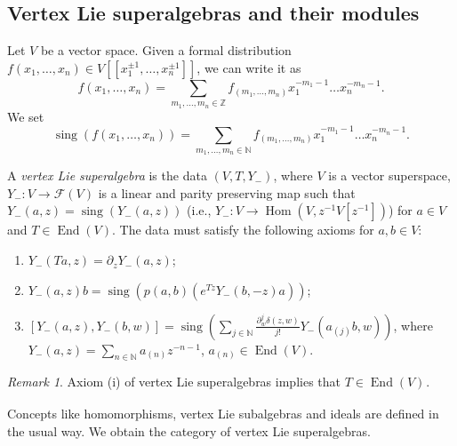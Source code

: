 \documentclass[a4paper, 12pt, reqno]{amsart}
\theoremstyle{remark}
\newtheorem{remark}[theorem]{Remark}
\DeclareMathOperator{\End}{End}
\DeclareMathOperator{\zero}{\overline{0}}
\DeclareMathOperator{\Hom}{Hom}
\DeclareMathOperator{\sing}{sing}
\begin{document}
\subsection{Vertex Lie superalgebras and their modules}
\label{sec:vert-lie-supera}

Let $V$ be a vector space.
Given a formal distribution $f(x_1, \dots, x_n) \in V[[x_1^{\pm 1}, \dots, x_n^{\pm 1}]]$, we can write it as
\begin{equation*}
  f(x_1, \dots, x_n) = \sum_{m_1, \dots, m_n \in \mathbb{Z}}f_{(m_1, \dots, m_n)}x_1^{-m_1 - 1}\dots x_n^{-m_n - 1}.
\end{equation*}
We set
\begin{equation*}
  \sing(f(x_1, \dots, x_n)) = \sum_{m_1, \dots, m_n \in \mathbb{N}}f_{(m_1, \dots, m_n)}x_1^{-m_1 - 1}\dots x_n^{-m_n - 1}.
\end{equation*}

A \emph{vertex Lie superalgebra} is the data $(V, T, Y_-)$, where $V$ is a vector superspace, $Y_-: V \to \mathcal{F}(V)$ is a linear and parity preserving map such that $Y_-(a, z) = \sing(Y_-(a, z))$ (i.e., $Y_-: V \to \Hom(V, z^{-1}V[z^{-1}])$) for $a \in V$ and $T \in \End(V)$.
The data must satisfy the following axioms for $a, b \in V$:
\begin{enumerate}
\item $Y_-(Ta, z) = \partial_zY_-(a, z)$;
\item $Y_-(a, z)b = \sing(p(a, b)(e^{Tz}Y_-(b, -z)a))$;
\item $[Y_-(a, z), Y_-(b, w)] = \sing(\sum_{j \in \mathbb{N}}\frac{\partial^j_w\delta(z, w)}{j!}Y_-(a_{(j)}b, w))$, where $Y_-(a, z) = \sum_{n \in \mathbb{N}}a_{(n)}z^{-n - 1}$, $a_{(n)} \in \End(V)$.
\end{enumerate}

\begin{remark}
  \label{rmk:37}
  Axiom (i) of vertex Lie superalgebras implies that $T \in \End(V)_{\zero}$.
\end{remark}

Concepts like homomorphisms, vertex Lie subalgebras and ideals are defined in the usual way.
We obtain the category of vertex Lie superalgebras.
\end{document}
